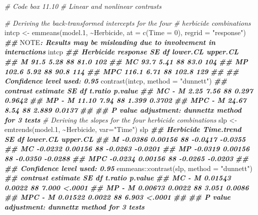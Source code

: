 \documentclass[
  12pt,
]{book}
\newenvironment{Shaded}{\begin{snugshade}}{\end{snugshade}}
\newcommand{\AlertTok}[1]{\textcolor[rgb]{0.94,0.16,0.16}{#1}}
\newcommand{\AttributeTok}[1]{\textcolor[rgb]{0.77,0.63,0.00}{#1}}
\newcommand{\CommentTok}[1]{\textcolor[rgb]{0.56,0.35,0.01}{\textit{#1}}}
\newcommand{\DecValTok}[1]{\textcolor[rgb]{0.00,0.00,0.81}{#1}}
\newcommand{\DocumentationTok}[1]{\textcolor[rgb]{0.56,0.35,0.01}{\textbf{\textit{#1}}}}
\newcommand{\FloatTok}[1]{\textcolor[rgb]{0.00,0.00,0.81}{#1}}
\newcommand{\FunctionTok}[1]{\textcolor[rgb]{0.00,0.00,0.00}{#1}}
\newcommand{\NormalTok}[1]{#1}
\newcommand{\OtherTok}[1]{\textcolor[rgb]{0.56,0.35,0.01}{#1}}
\newcommand{\SpecialCharTok}[1]{\textcolor[rgb]{0.00,0.00,0.00}{#1}}
\newcommand{\StringTok}[1]{\textcolor[rgb]{0.31,0.60,0.02}{#1}}
\begin{document}
\begin{Shaded}
\begin{Highlighting}[]
\CommentTok{\# Code box 11.10}
\CommentTok{\# Linear and nonlinear contrasts}

\CommentTok{\# Deriving the back{-}transformed intercepts for the four }
\CommentTok{\# herbicide combinations}
\NormalTok{intcp }\OtherTok{\textless{}{-}} \FunctionTok{emmeans}\NormalTok{(model}\FloatTok{.1}\NormalTok{, }\SpecialCharTok{\textasciitilde{}}\NormalTok{Herbicide, }\AttributeTok{at =} \FunctionTok{c}\NormalTok{(}\AttributeTok{Time =} \DecValTok{0}\NormalTok{),}
                 \AttributeTok{regrid =} \StringTok{"response"}\NormalTok{)}
\DocumentationTok{\#\# }\AlertTok{NOTE}\DocumentationTok{: Results may be misleading due to involvement in interactions}
\NormalTok{intcp}
\DocumentationTok{\#\#  Herbicide response   SE df lower.CL upper.CL}
\DocumentationTok{\#\#  M             91.5 5.28 88     81.0      102}
\DocumentationTok{\#\#  MC            93.7 5.41 88     83.0      104}
\DocumentationTok{\#\#  MP           102.6 5.92 88     90.8      114}
\DocumentationTok{\#\#  MPC          116.1 6.71 88    102.8      129}
\DocumentationTok{\#\# }
\DocumentationTok{\#\# Confidence level used: 0.95}
\FunctionTok{contrast}\NormalTok{(intcp, }\AttributeTok{method =} \StringTok{"dunnett"}\NormalTok{)}
\DocumentationTok{\#\#  contrast estimate   SE df t.ratio p.value}
\DocumentationTok{\#\#  MC {-} M       2.25 7.56 88   0.297  0.9642}
\DocumentationTok{\#\#  MP {-} M      11.10 7.94 88   1.399  0.3702}
\DocumentationTok{\#\#  MPC {-} M     24.67 8.54 88   2.889  0.0137}
\DocumentationTok{\#\# }
\DocumentationTok{\#\# P value adjustment: dunnettx method for 3 tests}
\CommentTok{\# Deriving the slopes for the four herbicide combinations}
\NormalTok{slp }\OtherTok{\textless{}{-}} \FunctionTok{emtrends}\NormalTok{(model}\FloatTok{.1}\NormalTok{, }\SpecialCharTok{\textasciitilde{}}\NormalTok{Herbicide, }\AttributeTok{var=}\StringTok{"Time"}\NormalTok{)}
\NormalTok{slp}
\DocumentationTok{\#\#  Herbicide Time.trend      SE df lower.CL upper.CL}
\DocumentationTok{\#\#  M            {-}0.0386 0.00156 88  {-}0.0417  {-}0.0355}
\DocumentationTok{\#\#  MC           {-}0.0232 0.00156 88  {-}0.0263  {-}0.0201}
\DocumentationTok{\#\#  MP           {-}0.0319 0.00156 88  {-}0.0350  {-}0.0288}
\DocumentationTok{\#\#  MPC          {-}0.0234 0.00156 88  {-}0.0265  {-}0.0203}
\DocumentationTok{\#\# }
\DocumentationTok{\#\# Confidence level used: 0.95}
\NormalTok{emmeans}\SpecialCharTok{::}\FunctionTok{contrast}\NormalTok{(slp, }\AttributeTok{method =} \StringTok{"dunnett"}\NormalTok{)}
\DocumentationTok{\#\#  contrast estimate     SE df t.ratio p.value}
\DocumentationTok{\#\#  MC {-} M    0.01543 0.0022 88   7.000  \textless{}.0001}
\DocumentationTok{\#\#  MP {-} M    0.00673 0.0022 88   3.051  0.0086}
\DocumentationTok{\#\#  MPC {-} M   0.01522 0.0022 88   6.903  \textless{}.0001}
\DocumentationTok{\#\# }
\DocumentationTok{\#\# P value adjustment: dunnettx method for 3 tests}
\end{Highlighting}
\end{Shaded}
\end{document}
